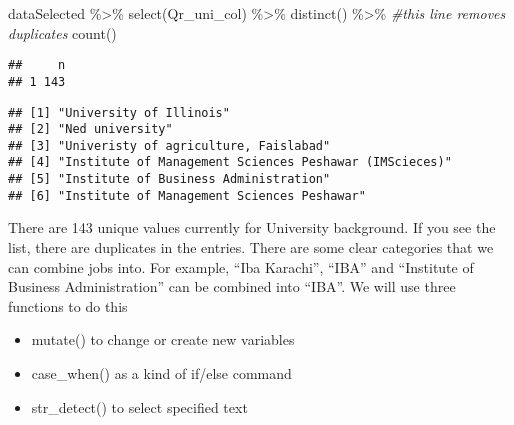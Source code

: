 \documentclass[
]{article}
\newenvironment{Shaded}{\begin{snugshade}}{\end{snugshade}}
\newcommand{\AttributeTok}[1]{\textcolor[rgb]{0.77,0.63,0.00}{#1}}
\newcommand{\CommentTok}[1]{\textcolor[rgb]{0.56,0.35,0.01}{\textit{#1}}}
\newcommand{\FunctionTok}[1]{\textcolor[rgb]{0.00,0.00,0.00}{#1}}
\newcommand{\NormalTok}[1]{#1}
\newcommand{\SpecialCharTok}[1]{\textcolor[rgb]{0.00,0.00,0.00}{#1}}
\providecommand{\tightlist}{%
  \setlength{\itemsep}{0pt}\setlength{\parskip}{0pt}}
\begin{document}
\begin{Shaded}
\begin{Highlighting}[]
\NormalTok{dataSelected }\SpecialCharTok{\%\textgreater{}\%} 
  \FunctionTok{select}\NormalTok{(Qr\_uni\_col) }\SpecialCharTok{\%\textgreater{}\%}
  \FunctionTok{distinct}\NormalTok{() }\SpecialCharTok{\%\textgreater{}\%} \CommentTok{\#this line removes duplicates}
  \FunctionTok{count}\NormalTok{()}
\end{Highlighting}
\end{Shaded}

\begin{verbatim}
##     n
## 1 143
\end{verbatim}

\begin{Shaded}
\end{Shaded}

\begin{verbatim}
## [1] "University of Illinois"                               
## [2] "Ned university"                                       
## [3] "Univeristy of agriculture, Faislabad"                 
## [4] "Institute of Management Sciences Peshawar (IMScieces)"
## [5] "Institute of Business Administration"                 
## [6] "Institute of Management Sciences Peshawar"
\end{verbatim}

There are 143 unique values currently for University background. If you
see the list, there are duplicates in the entries. There are some clear
categories that we can combine jobs into. For example, ``Iba Karachi'',
``IBA'' and ``Institute of Business Administration'' can be combined
into ``IBA''. We will use three functions to do this

\begin{itemize}
\tightlist
\item
  mutate() to change or create new variables
\item
  case\_when() as a kind of if/else command
\item
  str\_detect() to select specified text
\end{itemize}
\end{document}
